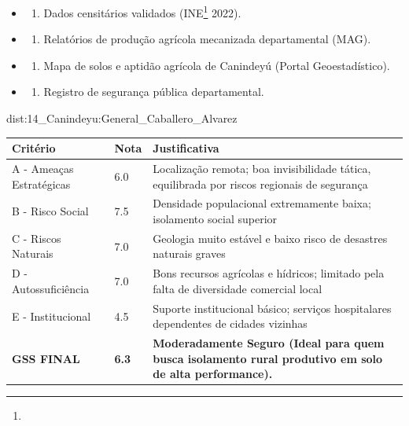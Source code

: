 {\begin{itemize}
\tightlist
\item
  \begin{enumerate}
  \def\labelenumi{\arabic{enumi})}
  \tightlist
  \item
    Dados censitários validados (INE\footnote{\fineINE} 2022).
  \end{enumerate}
\item
  \begin{enumerate}
  \def\labelenumi{\arabic{enumi})}
  \setcounter{enumi}{1}
  \tightlist
  \item
    Relatórios de produção agrícola mecanizada departamental (MAG).
  \end{enumerate}
\item
  \begin{enumerate}
  \def\labelenumi{\arabic{enumi})}
  \setcounter{enumi}{2}
  \tightlist
  \item
    Mapa de solos e aptidão agrícola de Canindeyú (Portal
    Geoestadístico).
  \end{enumerate}
\item
  \begin{enumerate}
  \def\labelenumi{\arabic{enumi})}
  \setcounter{enumi}{3}
  \tightlist
  \item
    Registro de segurança pública departamental.
  \end{enumerate}
\end{itemize}}{dist:14_Canindeyu:General_Caballero_Alvarez}
\begin{table}[ht!]
\small \begin{tabular}{p{3.0cm}p{0.8cm}p{6.0cm}} \toprule
\textbf{Critério} & \textbf{Nota} & \textbf{Justificativa} \\ \midrule
A - Ameaças Estratégicas & 6.0 & Localização remota; boa invisibilidade tática, equilibrada por riscos regionais de segurança \\
B - Risco Social & 7.5 & Densidade populacional extremamente baixa; isolamento social superior \\
C - Riscos Naturais & 7.0 & Geologia muito estável e baixo risco de desastres naturais graves \\
D - Autossuficiência & 7.0 & Bons recursos agrícolas e hídricos; limitado pela falta de diversidade comercial local \\
E - Institucional & 4.5 & Suporte institucional básico; serviços hospitalares dependentes de cidades vizinhas \\
\midrule \textbf{GSS FINAL} & \textbf{6.3} & \textbf{Moderadamente Seguro (Ideal para quem busca isolamento rural produtivo em solo de alta performance).} \\ \bottomrule \end{tabular}
\end{table}
